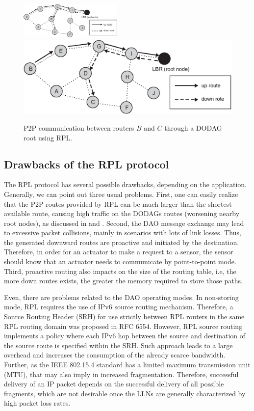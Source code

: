 \documentclass[final,authoryear,3p,twocolumn]{elsarticle}
\begin{document}
\begin{figure}[h!tb]
\centering
\ifdefined\TWOCOL
\includegraphics[width=0.45\textwidth]{figures/RPL_DAO}
\else
\includegraphics[width=1\textwidth]{RPL_DAO}
\fi
\caption{P2P communication between routers $B$ and $C$ through a DODAG root using RPL.}
\label{RPL_DAO}
\end{figure}

\subsection{Drawbacks of the RPL protocol}

The RPL protocol has several possible drawbacks, depending on the application. Generally, we can point out three usual problems. First, one can easily realize that the P2P routes provided by RPL can be much larger than the shortest available route, causing high traffic on the DODAGs routes (worsening nearby root nodes), as discussed in \citep{P2P_analysis_2010} and \citep{P2P-RPL_2011}. Second, the DAO message exchange may lead to excessive packet collisions, mainly in scenarios with lots of link losses. Thus, the generated downward routes are proactive and initiated by the destination. Therefore, in order for an actuator to make a request to a sensor, the sensor should know that an actuator needs to communicate by point-to-point mode. Third, proactive routing also impacts on the size of the routing table, i.e, the more down routes exists, the greater the memory required to store those paths.

Even, there are problems related to the DAO operating modes. In non-storing mode, RPL requires the use of IPv6 source routing mechanism. Therefore, a Source Routing Header (SRH) for use strictly between RPL routers in the same RPL routing domain was proposed in RFC 6554. However, RPL source routing implements a policy where each IPv6 hop between the source and destination of the source route is specified within the SRH. Such approach leads to a large overhead and increases the consumption of the already scarce bandwidth. Further, as the IEEE 802.15.4 standard has a limited maximum transmission unit (MTU), that may also imply in increased fragmentation. Therefore, successful delivery of an IP packet depends on the successful delivery of all possible fragments, which are not desirable once the LLNs are generally characterized by high packet loss rates.
\end{document}
